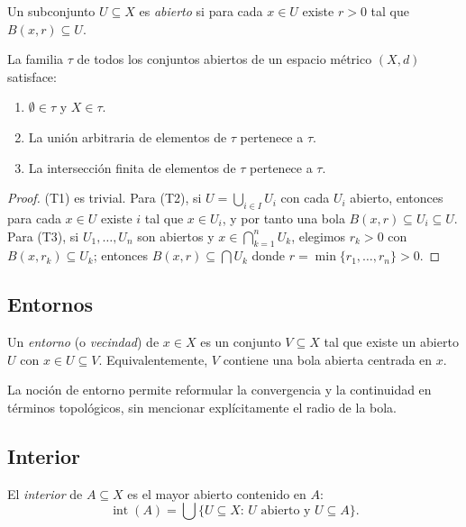 \begin{definition}
\label{def:abierto}
Un subconjunto $U\subseteq X$ es \emph{abierto} si para cada $x\in U$ existe $r>0$ tal que $B(x,r)\subseteq U$.
\end{definition}

\begin{theorem}
\label{teo:topologia-metrica}
La familia $\tau$ de todos los conjuntos abiertos de un espacio métrico $(X,d)$ satisface:
\begin{enumerate}
  \item[(T1)] $\emptyset\in\tau$ y $X\in\tau$.
  \item[(T2)] La unión arbitraria de elementos de $\tau$ pertenece a $\tau$.
  \item[(T3)] La intersección finita de elementos de $\tau$ pertenece a $\tau$.
\end{enumerate}
\end{theorem}

\begin{proof}
(T1) es trivial. Para (T2), si $U=\bigcup_{i\in I}U_i$ con cada $U_i$ abierto, entonces para cada $x\in U$ existe $i$ tal que $x\in U_i$, y por tanto una bola $B(x,r)\subseteq U_i\subseteq U$. Para (T3), si $U_1,\dots,U_n$ son abiertos y $x\in\bigcap_{k=1}^n U_k$, elegimos $r_k>0$ con $B(x,r_k)\subseteq U_k$; entonces $B(x,r)\subseteq\bigcap U_k$ donde $r=\min\{r_1,\dots,r_n\}>0$.
\end{proof}

\subsection{Entornos}

\begin{definition}
\label{def:entorno}
Un \emph{entorno} (o \emph{vecindad}) de $x\in X$ es un conjunto $V\subseteq X$ tal que existe un abierto $U$ con $x\in U\subseteq V$. Equivalentemente, $V$ contiene una bola abierta centrada en $x$.
\end{definition}

La noción de entorno permite reformular la convergencia y la continuidad en términos topológicos, sin mencionar explícitamente el radio de la bola.

\subsection{Interior}

\begin{definition}
\label{def:interior}
El \emph{interior} de $A\subseteq X$ es el mayor abierto contenido en $A$:
\[
  \operatorname{int}(A)=\bigcup\{U\subseteq X:\,U\text{ abierto y }U\subseteq A\}.
\]
\end{definition}

